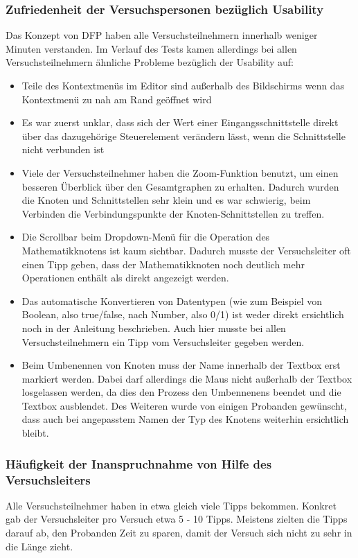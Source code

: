 \subsubsection{Zufriedenheit der Versuchspersonen bezüglich Usability}
Das Konzept von \ac{DFP} haben alle Versuchsteilnehmern innerhalb weniger Minuten verstanden. Im Verlauf des Tests kamen allerdings bei allen Versuchsteilnehmern ähnliche Probleme bezüglich der Usability auf:
\begin{itemize}
    \item Teile des Kontextmenüs im Editor sind außerhalb des Bildschirms wenn das Kontextmenü zu nah am Rand geöffnet wird
    \item Es war zuerst unklar, dass sich der Wert einer Eingangsschnittstelle direkt über das dazugehörige Steuerelement verändern lässt, wenn die Schnittstelle nicht verbunden ist
    \item Viele der Versuchsteilnehmer haben die Zoom-Funktion benutzt, um einen besseren Überblick über den Gesamtgraphen zu erhalten. Dadurch wurden die Knoten und Schnittstellen sehr klein und es war schwierig, beim Verbinden die Verbindungspunkte der Knoten-Schnittstellen zu treffen.
    \item Die Scrollbar beim Dropdown-Menü für die Operation des Mathematikknotens ist kaum sichtbar. Dadurch musste der Versuchsleiter oft einen Tipp geben, dass der Mathematikknoten noch deutlich mehr Operationen enthält als direkt angezeigt werden.
    \item Das automatische Konvertieren von Datentypen (wie zum Beispiel von Boolean, also true/false, nach Number, also 0/1) ist weder direkt ersichtlich noch in der Anleitung beschrieben. Auch hier musste bei allen Versuchsteilnehmern ein Tipp vom Versuchsleiter gegeben werden.
    \item Beim Umbenennen von Knoten muss der Name innerhalb der Textbox erst markiert werden. Dabei darf allerdings die Maus nicht außerhalb der Textbox losgelassen werden, da dies den Prozess den Umbennenens beendet und die Textbox ausblendet. Des Weiteren wurde von einigen Probanden gewünscht, dass auch bei angepasstem Namen der Typ des Knotens weiterhin ersichtlich bleibt.
\end{itemize}

\subsubsection{Häufigkeit der Inanspruchnahme von Hilfe des Versuchsleiters}
Alle Versuchsteilnehmer haben in etwa gleich viele Tipps bekommen. Konkret gab der Versuchsleiter pro Versuch etwa 5 - 10 Tipps. Meistens zielten die Tipps darauf ab, den Probanden Zeit zu sparen, damit der Versuch sich nicht zu sehr in die Länge zieht.

